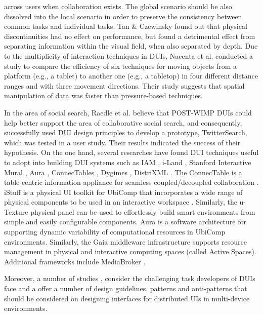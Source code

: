 across users when collaboration exists. The global scenario should be also
dissolved into the local scenario in order to preserve the consistency between
common tasks and individual tasks. Tan & Czewinsky \cite{tan2003effects} found
out that physical discontinuities had no effect on performance, but found a
detrimental effect from separating information within the visual field, when
also separated by depth. Due to the multiplicity of interaction techniques in
DUIs, Nacenta et al. conducted a study to compare the efficiency of six
techniques for moving objects from a platform (e.g., a tablet) to another one (e.g., a tabletop) in four different distance ranges and with three movement directions.
Their study suggests that spatial manipulation of data was faster than pressure-based techniques.\par
In the area of social search, Raedle et al. \cite{radle2013twistersearch}
believe that POST-WIMP DUIs could help better support the area of collaborative
social search, and consequently, successfully used DUI design principles to 
develop a prototype, TwitterSearch, which was tested in a user study. Their
results indicated the success of their hypothesis.
On the one hand, several researches have
found DUI techniques useful to adopt into building DUI systems such as IAM
\cite{coutaz2003software}, i-Land \cite{streitz1999land}, Stanford Interactive
Mural \cite{guimbretiere2001fluid}, Aura \cite{sousa2002aura}, ConnecTables
\cite{tandler2001connectables} , Dygimes \cite{vandervelpen2004towards},
DistriXML \cite{grolaux2004migratable}. The ConnecTable is a table-centric
information appliance for seamless coupled/decoupled collaboration
\cite{tandler2001connectables}. iStuff is a physical UI toolkit for UbiComp that
incorporates a wide range of physical components to be used in an interactive
workspace \cite{ballagas2003istuff}. Similarly, the u-Texture \cite{kohtake2005u}
physical panel can be used to effortlessly build smart environments from simple
and easily configurable components. Aura \cite{sousa2002aura} is a software architecture for supporting dynamic variability of computational resources in UbiComp environments.
Similarly, the Gaia \cite{roman2002middleware} middleware infrastructure supports resource
management in physical and interactive computing spaces (called Active Spaces). Additional
frameworks include MediaBroker \cite{modahl2004mediabroker}.\par
Moreover, a number of studies \cite{seifried2011lessons},
\cite{vanderdonckt2010distributed} consider the challenging task developers of
DUIs face and a offer a number of design guidelines, patterns and anti-patterns
that should be considered on designing interfaces for distributed UIs in
multi-device environments.
